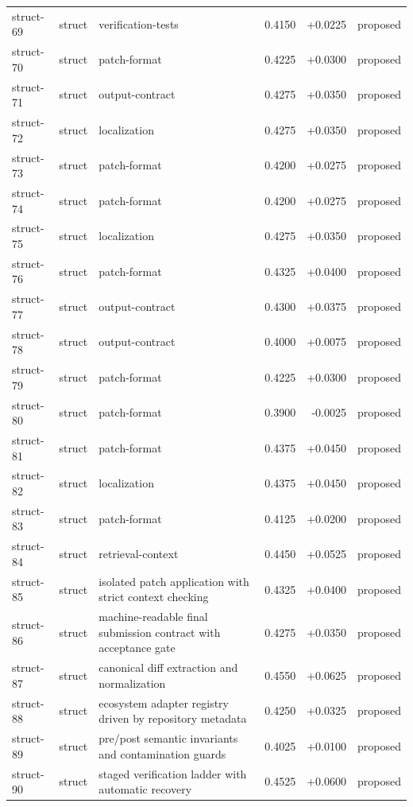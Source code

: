 \begin{center}
\begin{longtable}{llp{5.2cm}rrl}
struct-69 & struct & verification-tests & 0.4150 & +0.0225 & proposed \\
struct-70 & struct & patch-format & 0.4225 & +0.0300 & proposed \\
struct-71 & struct & output-contract & 0.4275 & +0.0350 & proposed \\
struct-72 & struct & localization & 0.4275 & +0.0350 & proposed \\
struct-73 & struct & patch-format & 0.4200 & +0.0275 & proposed \\
struct-74 & struct & patch-format & 0.4200 & +0.0275 & proposed \\
struct-75 & struct & localization & 0.4275 & +0.0350 & proposed \\
struct-76 & struct & patch-format & 0.4325 & +0.0400 & proposed \\
struct-77 & struct & output-contract & 0.4300 & +0.0375 & proposed \\
struct-78 & struct & output-contract & 0.4000 & +0.0075 & proposed \\
struct-79 & struct & patch-format & 0.4225 & +0.0300 & proposed \\
struct-80 & struct & patch-format & 0.3900 & -0.0025 & proposed \\
struct-81 & struct & patch-format & 0.4375 & +0.0450 & proposed \\
struct-82 & struct & localization & 0.4375 & +0.0450 & proposed \\
struct-83 & struct & patch-format & 0.4125 & +0.0200 & proposed \\
struct-84 & struct & retrieval-context & 0.4450 & +0.0525 & proposed \\
struct-85 & struct & isolated patch application with strict context checking & 0.4325 & +0.0400 & proposed \\
struct-86 & struct & machine-readable final submission contract with acceptance gate & 0.4275 & +0.0350 & proposed \\
struct-87 & struct & canonical diff extraction and normalization & 0.4550 & +0.0625 & proposed \\
struct-88 & struct & ecosystem adapter registry driven by repository metadata & 0.4250 & +0.0325 & proposed \\
struct-89 & struct & pre/post semantic invariants and contamination guards & 0.4025 & +0.0100 & proposed \\
struct-90 & struct & staged verification ladder with automatic recovery & 0.4525 & +0.0600 & proposed \\

\end{longtable}
\end{center}
